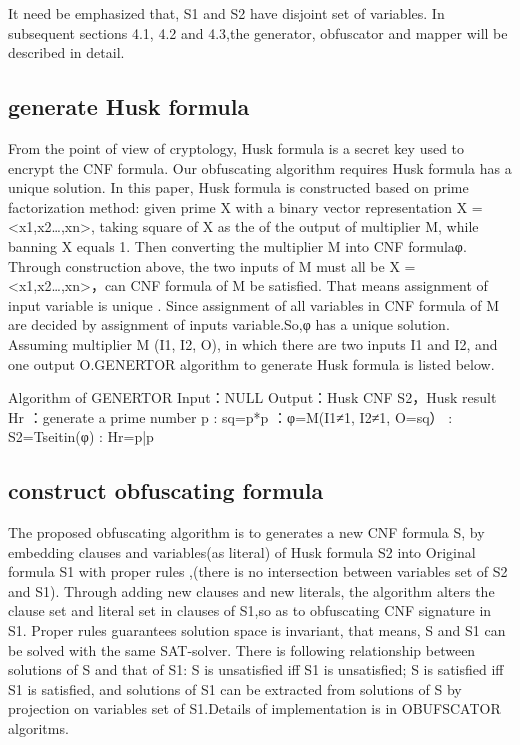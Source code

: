 \documentclass[runningheads,a4paper]{llncs}
\begin{document}
It need be emphasized that, S1 and S2 have disjoint set of variables. In subsequent sections 4.1, 4.2 and 4.3,the generator, obfuscator and mapper will be described in detail. 

\subsection{generate Husk formula}
From the point of view of cryptology, Husk formula is a secret key used to encrypt the CNF formula. Our obfuscating algorithm requires Husk formula has a unique solution. In this paper, Husk formula is constructed based on prime factorization method: given prime X with a binary vector representation X = <x1,x2…,xn>, taking square of X as the of the output of multiplier M, while banning X equals 1. Then converting the multiplier M into CNF formulaφ. Through construction above, the two inputs of M must all be X = <x1,x2…,xn>，can CNF formula of M be satisfied. That means assignment of input variable is unique . Since assignment of all variables in CNF formula of M are decided by assignment of inputs variable.So,φ has a unique solution. Assuming multiplier M (I1, I2, O), in which there are two inputs I1 and I2, and one output O.GENERTOR algorithm to generate Husk formula is listed below.

Algorithm of GENERTOR
\newline Input：NULL
\newline Output：Husk CNF S2，Husk result Hr
：generate a prime number p
:  sq=p*p
：φ=M(I1≠1, I2≠1, O=sq）
:  S2=Tseitin(φ)
:  Hr=p|p

\subsection{construct obfuscating formula}

The proposed obfuscating algorithm is to generates a new CNF formula S, by embedding clauses and variables(as literal) of Husk formula S2 into Original formula S1 with proper rules ,(there is no intersection between variables set of S2 and S1). Through adding new clauses and new literals, the algorithm alters the clause set and literal set in clauses of S1,so as to obfuscating CNF signature in S1. Proper rules guarantees solution space is invariant, that means, S and S1 can be solved with the same SAT-solver. There is following relationship between solutions of S and that of S1: S is unsatisfied iff S1 is unsatisfied; S is satisfied iff S1 is satisfied, and solutions of S1 can be extracted from solutions of S by projection on variables set of S1.Details of implementation is in OBUFSCATOR algoritms.
\end{document}

